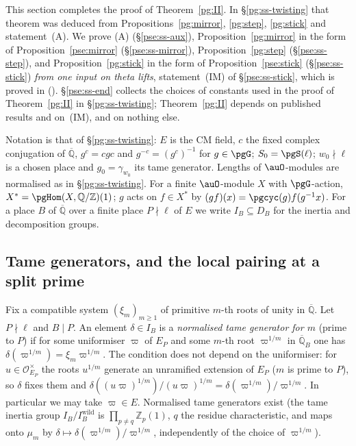 \documentclass[10pt]{amsart}
\theoremstyle{definition}
\theoremstyle{remark}
\newcommand{\Z}{\mathbb Z}
\newcommand{\Q}{\mathbb Q}
\begin{document}
This section completes the proof of Theorem~\ref{pg:II}. In \S\ref{pg:ss-twisting} that theorem
was deduced from Propositions~\ref{pg:mirror}, \ref{pg:step}, \ref{pg:stick} and statement~(A).
We prove (A) (\S\ref{pse:ss-aux}), Proposition~\ref{pg:mirror} in the form of Proposition~\ref{pse:mirror}
(\S\ref{pse:ss-mirror}), Proposition~\ref{pg:step} (\S\ref{pse:ss-step}), and
Proposition~\ref{pg:stick} in the form of Proposition~\ref{pse:stick} (\S\ref{pse:ss-stick}) \emph{from one input on
theta lifts}, statement~(IM) of \S\ref{pse:ss-stick}, which is proved in {\cite[\S3.1]{P54}}
({\cite[Propositions~3.8 and~3.12]{P54}}). \S\ref{pse:ss-end} collects the choices of constants used in the proof of
Theorem~\ref{pg:II} in \S\ref{pg:ss-twisting}; Theorem~\ref{pg:II} depends on published results and
on~(IM), and on nothing else.

Notation is that of \S\ref{pg:ss-twisting}: $E$ is the CM field, $c$ the fixed complex conjugation
of $\overline{\Q}$, $g^c=cgc$ and $g^{-c}=(g^c)^{-1}$ for $g\in\pgG$; $S_0=\pgS(\ell)$; $w_0\nmid\ell$
is a chosen place and $g_0=\gamma_{w_0}$ its tame generator. Lengths of $\auO$-modules are
normalised as in \S\ref{pg:ss-twisting}. For a finite $\auO$-module $X$ with $\pgG$-action,
$X^*=\pgHom(X,\Q/\Z)(1)$; $g$ acts on $f\in X^*$ by $(gf)(x)=\pgcyc(g)f(g^{-1}x)$.
For a place $B$ of $\overline{\Q}$ over a finite place $P\nmid\ell$ of $E$ we write $I_B\subseteq
D_B$ for the inertia and decomposition groups.

\subsection{Tame generators, and the local pairing at a split prime}\label{pse:ss-tame}

Fix a compatible system $(\xi_m)_{m\ge1}$ of primitive $m$-th roots of unity in $\overline{\Q}$.
Let $P\nmid\ell$ and $B\mid P$. An element $\delta\in I_B$ is a \emph{normalised tame generator for
$m$} (prime to $P$) if for some uniformiser $\varpi$ of $E_P$ and some $m$-th root $\varpi^{1/m}$ in
$\overline{\Q}_B$ one has $\delta(\varpi^{1/m})=\xi_m\varpi^{1/m}$. The condition does not depend on
the uniformiser: for $u\in\mathcal O_{E_P}^\times$ the roots $u^{1/m}$ generate an unramified
extension of $E_P$ ($m$ is prime to $P$), so $\delta$ fixes them and $\delta((u\varpi)^{1/m})/
(u\varpi)^{1/m}=\delta(\varpi^{1/m})/\varpi^{1/m}$. In particular we may take $\varpi\in E$. Normalised tame generators
exist (the tame inertia group $I_B/I_B^{\mathrm{wild}}$ is $\prod_{p\ne q}\Z_p(1)$, $q$ the residue
characteristic, and maps onto $\mu_m$ by $\delta\mapsto\delta(\varpi^{1/m})/\varpi^{1/m}$, independently
of the choice of $\varpi^{1/m}$).
\end{document}
